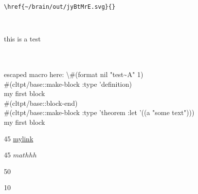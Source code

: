 \documentclass[11pt]{article}
\begin{document}
\begin{lstlisting}\href{~/brain/out/jyBtMrE.svg}{}\end{lstlisting}\\\begin{dummy}
  this is a test
\end{dummy}\\\\escaped macro here: \textbackslash{}\#(format nil "test\textasciitilde{}A" 1)\\\#(cltpt/base::make-block :type 'definition)\\my first block\\\#(cltpt/base::block-end)\\\#(cltpt/base::make-block :type 'theorem :let '((a "some text")))\\  my first block\\  %
\item 45 \href{mylink}{mylink}

\item 45 \(mathhh\)

\item 50

\item 10
\end{document}
